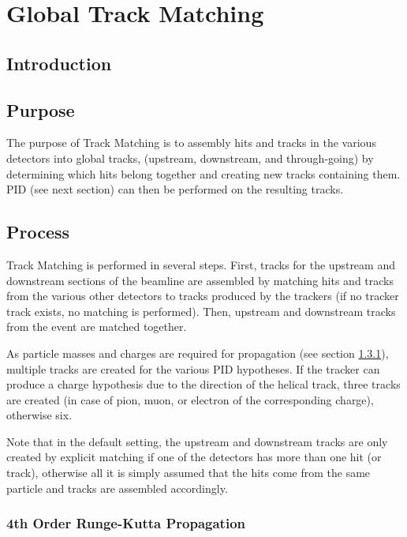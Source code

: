 \chapter{Global Track Matching}
\label{chapter:globaltrackmatching}

\section{Introduction}\label{sec:tmintro}

\section{Purpose}\label{sec:tmpurpose}

The purpose of Track Matching is to assembly hits and tracks in the various detectors into global tracks,
(upstream, downstream, and through-going) by determining which hits belong together and creating new tracks
containing them. PID (see next section) can then be performed on the resulting tracks.

\section{Process}\label{sec:tmprocess}

Track Matching is performed in several steps. First, tracks for the upstream and downstream sections of the
beamline are assembled by matching hits and tracks from the various other detectors to tracks produced by the
trackers (if no tracker track exists, no matching is performed). Then, upstream and downstream tracks from the
event are matched together.

As particle masses and charges are required for propagation (see section \ref{subsec:tmrk4}), multiple tracks
are created for the various PID hypotheses. If the tracker can produce a charge hypothesis due to the direction
of the helical track, three tracks are created (in case of pion, muon, or electron of the corresponding charge),
otherwise six.

Note that in the default setting, the upstream and downstream tracks are only created by explicit matching if
one of the detectors has more than one hit (or track), otherwise all it is simply assumed that the hits come from
the same particle and tracks are assembled accordingly.

\subsection{4th Order Runge-Kutta Propagation}\label{subsec:tmrk4}

